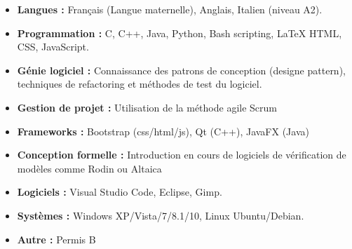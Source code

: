 \documentclass[11pt,a4paper,sans]{moderncv}
\begin{document}
\begin{itemize}

	\item \textbf{Langues :} Français (Langue maternelle), Anglais, Italien (niveau A2).

	      \vspace{6pt}

	\item \textbf{Programmation :} C, C++, Java, Python, Bash scripting, LaTeX
	      HTML, CSS, JavaScript.

          \vspace{6pt}

    	\item \textbf{Génie logiciel :} Connaissance des patrons de conception
    		(designe pattern), techniques de refactoring et méthodes de test du logiciel.

	    \vspace{6pt}

    	\item \textbf{Gestion de projet :} Utilisation de la méthode agile Scrum

    	\vspace{6pt}

	\item \textbf{Frameworks :} Bootstrap (css/html/js), Qt (C++), JavaFX (Java)

		\vspace{6pt}

	\item \textbf{Conception formelle :} Introduction en cours de logiciels
	de vérification de modèles comme Rodin ou Altaica

		\vspace{6pt}

	\item \textbf{Logiciels :} Visual Studio Code, Eclipse, Gimp.

	      \vspace{6pt}

	\item \textbf{Systèmes :} Windows XP/Vista/7/8.1/10, Linux Ubuntu/Debian.

	      \vspace{6pt}

	\item \textbf{Autre :} Permis B

\end{itemize}
\end{document}
